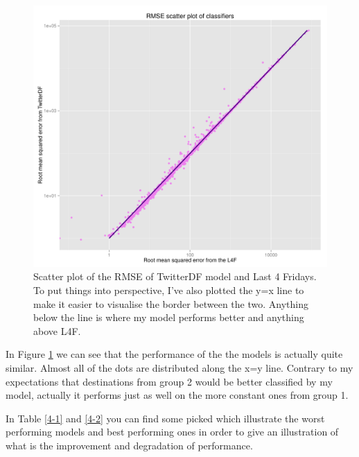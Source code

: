 \documentclass[minf,frontabs,twoside,singlespacing,parskip]{infthesis}
\begin{document}
\begin{figure}[]
\begin{center}
\includegraphics[scale=0.4]{RMSE}
\end{center}
\caption{Scatter plot of the RMSE of TwitterDF model and Last 4 Fridays. To put things into perspective, I've also plotted the y=x line to make it easier to visualise the border between the two. Anything below the line is where my model performs better and anything above L4F.  }
\label{rmse-scatter}
\end{figure}

In Figure \ref{rmse-scatter} we can see that the performance of the the models is actually quite similar. Almost all of the dots are distributed along the x=y line. Contrary to my expectations that destinations from group 2 would be better classified by my model, actually it performs just as well on the more constant ones from group 1. 

In Table \ref{4-1} and \ref{4-2} you can find some picked which illustrate the worst performing models and best performing ones in order to give an illustration of what is the improvement and degradation of performance.
\end{document}
